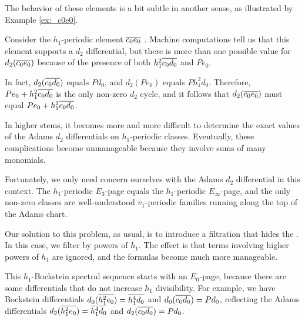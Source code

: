 The behavior of these elements is a bit subtle in another sense, 
as illustrated
by Example \ref{ex:_c0e0}.

\begin{ex}
\label{ex:_c0e0}
Consider the $h_1$-periodic element $\overline{c_0 e_0}$
.
Machine computations tell us that this element supports a 
$d_2$ differential, but there is more than one possible value
for $d_2(\overline{c_0 e_0})$ because of the presence of
both $h_1^2 \overline{c_0 d_0}$ and $P e_0$.

In fact, $d_2(\overline{c_0 d_0})$ equals $P d_0$, and
$d_2(P e_0)$ equals $P h_1^2 d_0$.  Therefore,
$P e_0 + h_1^2 \overline{c_0 d_0}$ is the only non-zero $d_2$ cycle,
and it follows that 
$d_2(\overline{c_0 e_0})$ must equal $P e_0 + h_1^2 \overline{c_0 d_0}$.

\end{ex}


In higher stems, it becomes more and more difficult to determine
the exact values of the Adams $d_2$ differentials
on $h_1$-periodic classes.  Eventually, these complications
become unmanageable because they involve sums of many monomials.

Fortunately, we only need concern ourselves with the Adams
$d_2$ differential in this context.
The $h_1$-periodic $E_3$-page equals the $h_1$-periodic
$E_\infty$-page, and the only non-zero classes are well-understood
$v_1$-periodic families running along the top of the Adams chart.

Our solution to this problem, as usual, is to introduce a filtration
that hides the .
In this case, we filter by powers of $h_1$.  The effect is that
terms involving higher powers of $h_1$ are ignored, and the
formulas become much more manageable.

This $h_1$-Bockstein spectral sequence starts with an $E_0$-page,
because there are some differentials that do not increase
$h_1$ divisibility.  For example, we have
Bockstein differentials $d_0(\overline{h_1^2 e_0}) = \overline{h_1^4 d_0}$
and $d_0(\overline{c_0 d_0}) = P d_0$, reflecting the Adams
differentials $d_2(\overline{h_1^2 e_0}) = \overline{h_1^4 d_0}$
and $d_2(\overline{c_0 d_0}) = P d_0$.

